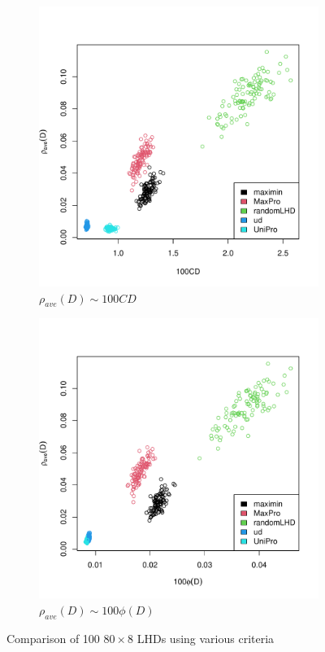 \documentclass [PhD] {package/uclathes}
\begin{document}
\begin{figure}
\begin{adjustwidth}{-2cm}{-2cm}
\begin{subfigure}[b]{0.3\textwidth}
\end{subfigure}
\begin{subfigure}[b]{0.3\textwidth}
\centering
\caption{$\rho_{ave}(D)\sim 100CD$}
\includegraphics[width=\textwidth]{chapters/EGO/pdfs/cd_rho_ave}
\end{subfigure}
\begin{subfigure}[b]{0.3\textwidth}
\centering
\caption{$\rho_{ave}(D)\sim 100\phi(D)$}
\includegraphics[width=\textwidth]{chapters/EGO/pdfs/eta_rho_ave}
\end{subfigure}
\caption{Comparison of 100 $80\times 8$ LHDs using various criteria}
\label{fig:comparison}
\end{adjustwidth}
\end{figure}
\end{document}
